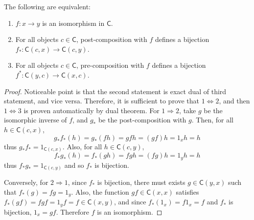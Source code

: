 \begin{lemma} The following are equivalent:
\begin{enumerate}
\item $f:x\rightarrow y$ is an isomorphism in $\mathsf{C}$.
\item For all objects $c\in \mathsf{C}$, post-composition with $f$ defines a bijection $f_*:\mathsf{C}(c,x)\rightarrow \mathsf{C}(c,y)$.
\item For all objects $c\in \mathsf{C}$, pre-composition with $f$ defines a bijection $f^*:\mathsf{C}(y,c)\rightarrow \mathsf{C}(x,c)$.
\end{enumerate}
\end{lemma}
\begin{proof} Noticeable point is that the second statement is exact dual of third statement, and vice versa. Therefore, it is sufficient to prove that $1\Leftrightarrow 2$, and then $1\Leftrightarrow 3$ is proven automatically by dual theorem.
For $1\Rightarrow 2$, take $g$ be the isomorphic inverse of $f$, and $g_*$ be the post-composition with $g$. Then, for all $h\in \mathsf{C}(c,x)$,
\begin{equation}
g_* f_*(h)=g_*(fh)=gfh=(gf)h=1_x h=h
\end{equation}
thus $g_* f_*=1_{\mathsf{C}(c,x)}$. Also, for all $h\in \mathsf{C}(c,y)$,
\begin{equation}
f_* g_*(h)=f_*(gh)=fgh=(fg)h=1_y h=h
\end{equation}
thus $f_* g_*=1_{\mathsf{C}(c,y)}$ and so $f_*$ is bijection.

Conversely, for $2\Rightarrow 1$, since $f_*$ is bijection, there must exists $g\in \mathsf{C}(y,x)$ such that $f_*(g)=fg=1_y$. Also, the function $gf\in \mathsf{C}(x,x)$ satisfies $f_*(gf)=fgf=1_yf=f\in \mathsf{C}(x,y)$, and since $f_*(1_x)=f 1_x=f$ and $f_*$ is bijection, $1_x=gf$. Therefore $f$ is an isomorphism.
\end{proof}

